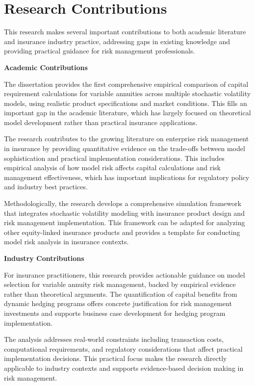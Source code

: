 \documentclass[12pt,a4paper]{report}
\begin{document}
\section{Research Contributions}

This research makes several important contributions to both academic literature and insurance industry practice, addressing gaps in existing knowledge and providing practical guidance for risk management professionals.

\textbf{Academic Contributions}

The dissertation provides the first comprehensive empirical comparison of capital requirement calculations for variable annuities across multiple stochastic volatility models, using realistic product specifications and market conditions. This fills an important gap in the academic literature, which has largely focused on theoretical model development rather than practical insurance applications.

The research contributes to the growing literature on enterprise risk management in insurance by providing quantitative evidence on the trade-offs between model sophistication and practical implementation considerations. This includes empirical analysis of how model risk affects capital calculations and risk management effectiveness, which has important implications for regulatory policy and industry best practices.

Methodologically, the research develops a comprehensive simulation framework that integrates stochastic volatility modeling with insurance product design and risk management implementation. This framework can be adapted for analyzing other equity-linked insurance products and provides a template for conducting model risk analysis in insurance contexts.

\textbf{Industry Contributions}

For insurance practitioners, this research provides actionable guidance on model selection for variable annuity risk management, backed by empirical evidence rather than theoretical arguments. The quantification of capital benefits from dynamic hedging programs offers concrete justification for risk management investments and supports business case development for hedging program implementation.

The analysis addresses real-world constraints including transaction costs, computational requirements, and regulatory considerations that affect practical implementation decisions. This practical focus makes the research directly applicable to industry contexts and supports evidence-based decision making in risk management.
\end{document}

